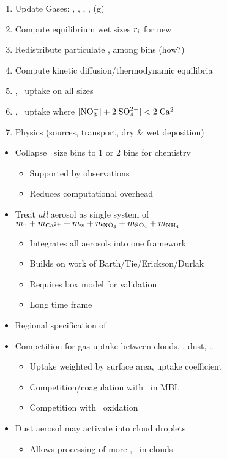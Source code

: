 \documentclass[final,dvips]{foils}
\begin{document}
\rotatefoilhead{%
\Large\textcolor{blue}{\hfill Model Flow \hfill}}\vspace{-0.5in}\large
\begin{enumerate}
\item Update Gases: \NOy, \HOx, \Ot, \SOd, \SOqdm(g)
\item Compute equilibrium wet sizes $r_i$ for new \RH\
\item Redistribute particulate \NOtm, \SOqdm among bins (how?)
\item Compute kinetic diffusion/thermodynamic equilibria 
\item \HOd, \Ot\ uptake on all sizes
\item \HNOt, \SOd\ uptake where $[\NOtm] + 2[\SOqdm] < 2[\Cadp]$
\item Physics (sources, transport, dry \& wet deposition)
\end{enumerate}

\rotatefoilhead{%
\Large\textcolor{blue}{\hfill Model Optimization \hfill}}\vspace{-0.5in}\large
\begin{itemize}
\item Collapse \NNN\ size bins to 1 or 2 bins for chemistry
\begin{itemize}
\item Supported by observations
\item Reduces computational overhead
\end{itemize}
\item Treat \textit{all} aerosol as single system of $\mssaernsl + 
\mssaerCadp + \mssaerwtr + \mssaerNOt + \mssaerSOq + \mssaerNHq$
\begin{itemize}
\item Integrates all aerosols into one framework
\item Builds on work of Barth/Tie/Erickson/Durlak
\item Requires box model for validation
\item Long time frame
\end{itemize}
\item Regional specification of \Cadp\ \cite[]{CaS98}
\end{itemize}

\rotatefoilhead{%
\Large\textcolor{blue}{\hfill Aerosol Interactions \hfill}}\vspace{-0.5in}\large
\begin{itemize}
\item Competition for gas uptake between clouds, \NHqdSOq, dust, \ldots
\begin{itemize}
\item Uptake weighted by surface area, uptake coefficient
\item Competition/coagulation with \NaCl\ in MBL
\item Competition with \SOd\ oxidation
\end{itemize}
\item Dust aerosol may activate into cloud droplets
\begin{itemize}
\item Allows processing of more \SOqdm, \Ot\ in clouds
\end{itemize}
\end{itemize}

\rotatefoilhead{%
\Large\textcolor{blue}{\hfill References\hfill}}\vspace{-0.5in}\large


\end{document}
